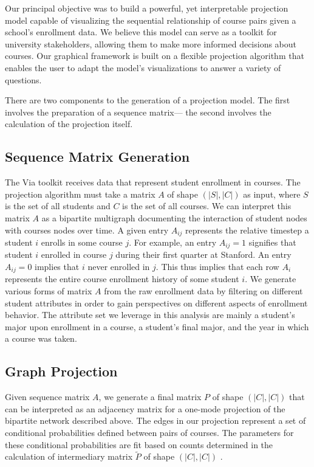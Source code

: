 \documentclass{sigchi}
\begin{document}
Our principal objective was to build a powerful, yet interpretable projection model capable of visualizing the sequential relationship of course pairs given a school's enrollment data. We believe this model can serve as a toolkit for university stakeholders, allowing them to make more informed decisions about courses. Our graphical framework is built on a flexible projection algorithm that enables the user to adapt the model's visualizations to answer a variety of questions. 

There are two components to the generation of a projection model. The first involves the preparation of a sequence matrix--- the second involves the calculation of the projection itself.

\subsection{Sequence Matrix Generation}

The Via toolkit receives data that represent student enrollment in courses. The projection algorithm must take a matrix $A$ of shape $(|S|, |C|)$ as input, where $S$ is the set of all students and $C$ is the set of all courses. We can interpret this matrix $A$ as a bipartite multigraph documenting the interaction of student nodes with courses nodes over time. A given entry $A_{ij}$ represents the relative timestep a student $i$ enrolls in some course $j$. For example, an entry $A_{ij} = 1$ signifies that student $i$ enrolled in course $j$ during their first quarter at Stanford. An entry $A_{ij} = 0$ implies that $i$ never enrolled in $j$. This thus implies that each row $A_i$ represents the entire course enrollment history of some student $i$. We generate various forms of matrix $A$ from the raw enrollment data by filtering on different student attributes in order to gain perspectives on different aspects of enrollment behavior. The attribute set we leverage in this analysis are mainly a student's major upon enrollment in a course, a student's final major, and the year in which a course was taken. 

\subsection{Graph Projection}

Given sequence matrix $A$, we generate a final matrix $P$ of shape $(|C|, |C|)$ that can be interpreted as an adjacency matrix for a one-mode projection of the bipartite network described above. The edges in our projection represent a set of conditional probabilities defined between pairs of courses. The parameters for these conditional probabilities are fit based on counts determined in the calculation of intermediary matrix $\tilde{P}$ of shape $(|C|, |C|)$ . 
\end{document}
